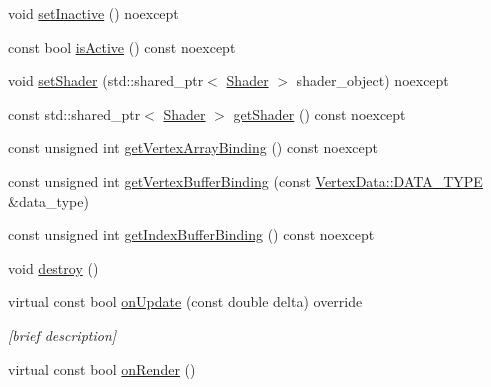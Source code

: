 \begin{DoxyCompactItemize}
\item 
void \hyperlink{class_graphics_1_1_renderable_a9b6b9bf46beb9e4df9a0ba1dae55b87e}{set\+Inactive} () noexcept
\item 
const bool \hyperlink{class_graphics_1_1_renderable_a3ee6ae0274eaed19b731a97c5b44d2d6}{is\+Active} () const noexcept
\item 
void \hyperlink{class_graphics_1_1_renderable_a481dfc871e6129e8ee55482207ddc7fa}{set\+Shader} (std\+::shared\+\_\+ptr$<$ \hyperlink{class_graphics_1_1_shader}{Shader} $>$ shader\+\_\+object) noexcept
\item 
const std\+::shared\+\_\+ptr$<$ \hyperlink{class_graphics_1_1_shader}{Shader} $>$ \hyperlink{class_graphics_1_1_renderable_a542b918d1c6375ffdd06881d3fc31edd}{get\+Shader} () const noexcept
\item 
const unsigned int \hyperlink{class_graphics_1_1_renderable_afde066c6e5ab15ce9b055f9f8f4593ff}{get\+Vertex\+Array\+Binding} () const noexcept
\item 
const unsigned int \hyperlink{class_graphics_1_1_renderable_afced46b2a268070ed112c68557ad0500}{get\+Vertex\+Buffer\+Binding} (const \hyperlink{class_graphics_1_1_vertex_data_a50e88236939dc2a3ec4df7aeb728620e}{Vertex\+Data\+::\+D\+A\+T\+A\+\_\+\+T\+Y\+P\+E} \&data\+\_\+type)
\item 
const unsigned int \hyperlink{class_graphics_1_1_renderable_ab0414e9ceb2a33b5343fa8c55422afe7}{get\+Index\+Buffer\+Binding} () const noexcept
\item 
void \hyperlink{class_graphics_1_1_renderable_af1b5b7707b67d9224e67604c4368b527}{destroy} ()
\item 
virtual const bool \hyperlink{class_graphics_1_1_renderable_a7d0e820c55cb7f5c552aa0c1e846db76}{on\+Update} (const double delta) override
\begin{DoxyCompactList}\small\item\em \mbox{[}brief description\mbox{]} \end{DoxyCompactList}\item 
virtual const bool \hyperlink{class_graphics_1_1_renderable_afafd0e6147c73090234670934bbb8cbb}{on\+Render} ()
\end{DoxyCompactItemize}
